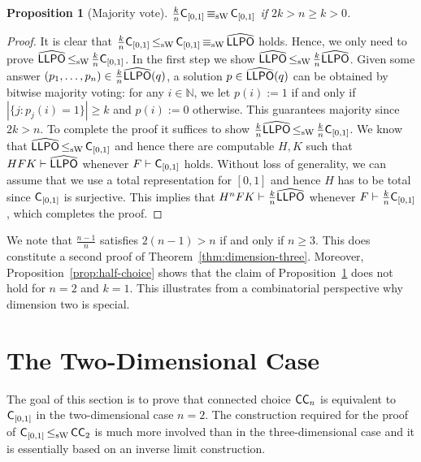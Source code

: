 \documentclass[a4paper]{amsart}
\def\IN{{\mathbb{N}}}
\def\LLPO{\text{\rm\sffamily LLPO}}
\def\C{\mbox{\rm\sffamily C}}
\def\ConC{\mbox{\rm\sffamily CC}}
\def\LLPO{\mbox{\rm\sffamily LLPO}}
\def\leqSW{\mathop{\leq_{\mathrm{sW}}}}
\def\equivSW{\mathop{\equiv_{\mathrm{sW}}}}
\newtheorem{proposition}[theorem]{Proposition}
\theoremstyle{definition}
\begin{document}
\begin{proposition}[Majority vote] 
\label{prop:majority}
$\frac{k}{n}\C_{[0,1]} \equivSW\C_{[0,1]}$ if $2k>n\geq k>0$.
\end{proposition} 
\begin{proof} 
It is clear that $\frac{k}{n}\C_{[0,1]} \leqSW\C_{[0,1]}\equivSW\widehat{\LLPO}$ holds.
Hence, we only need to prove $\widehat{\LLPO}\leqSW\frac{k}{n}\C_{[0,1]}$.
In the first step we show $\widehat{\LLPO} \leqSW \frac{k}{n}\widehat{\LLPO}$. 
Given some answer $(p_1, \ldots, p_{n}) \in \frac{k}{n}\widehat{\LLPO}(q)$, 
a solution $p \in \widehat{\LLPO}(q)$ can be obtained by bitwise majority voting: 
for any $i \in\IN$, we let $p(i) := 1$ if and only if $|\{j : p_j(i) = 1\}| \geq k$ 
and $p(i) := 0$ otherwise. This guarantees majority since $2k>n$.
To complete the proof it suffices to show $\frac{k}{n}\widehat{\LLPO}\leqSW\frac{k}{n}\C_{[0,1]}$.
We know that $\widehat{\LLPO}\leqSW\C_{[0,1]}$ and hence there are computable $H,K$ such that
$HFK\vdash\widehat{\LLPO}$ whenever $F\vdash\C_{[0,1]}$ holds. Without loss of generality,
we can assume that we use a total representation for $[0,1]$ and hence $H$ has to be total since $\C_{[0,1]}$ is surjective.
This implies that $H^{n}FK\vdash\frac{k}{n}\widehat{\LLPO}$ whenever $F\vdash\frac{k}{n}\C_{[0,1]}$,
which completes the proof.
\end{proof} 

We note that $\frac{n-1}{n}$ satisfies $2(n-1)>n$ if and only if $n\geq3$.
This does constitute a second proof of Theorem~\ref{thm:dimension-three}.
Moreover, Proposition~\ref{prop:half-choice} shows that the claim of Proposition~\ref{prop:majority} does not hold for $n=2$ and $k=1$.
This illustrates from a combinatorial perspective why dimension two is special.


\section{The Two-Dimensional Case}
\label{sec:dim2}

The goal of this section is to prove that connected choice $\ConC_n$ is equivalent to $\C_{[0,1]}$ 
in the two-dimensional case $n=2$. The construction required for the proof of $\C_{[0,1]}\leqSW\ConC_2$ 
is much more involved than in the three-dimensional
case and it is essentially based on an inverse limit construction. 
\end{document}
